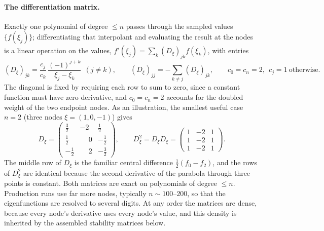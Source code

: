 \documentclass[11pt]{article}
\begin{document}
\paragraph{The differentiation matrix.} Exactly one polynomial of degree $\le n$ passes through
the sampled values $\{f(\xi_j)\}$; differentiating that interpolant and evaluating the result at
the nodes is a linear operation on the values, $f'(\xi_j)=\sum_k(D_\xi)_{jk}f(\xi_k)$, with
entries \cite{dons1995,trefethen2000}
\begin{equation}\label{eq:Dformula}
  (D_\xi)_{jk}=\frac{c_j}{c_k}\,\frac{(-1)^{j+k}}{\xi_j-\xi_k}\ \ (j\neq k),\qquad
  (D_\xi)_{jj}=-\!\!\sum_{k\neq j}(D_\xi)_{jk},\qquad
  c_0=c_n=2,\ \ c_j=1\ \text{otherwise}.
\end{equation}
The diagonal is fixed by requiring each row to sum to zero, since a constant function must have
zero derivative, and $c_0=c_n=2$ accounts for the doubled weight of the two endpoint nodes. As an
illustration, the smallest useful case $n=2$ (three nodes $\xi=(1,0,-1)$) gives
\begin{equation}\label{eq:Dexample}
  D_\xi=
  \begin{pmatrix}
    \tfrac32 & -2 & \tfrac12\\[3pt]
    \tfrac12 & \phantom{-}0 & -\tfrac12\\[3pt]
    -\tfrac12 & \phantom{-}2 & -\tfrac32
  \end{pmatrix},
  \qquad
  D_\xi^2=D_\xi D_\xi=
  \begin{pmatrix}
    1 & -2 & 1\\
    1 & -2 & 1\\
    1 & -2 & 1
  \end{pmatrix}.
\end{equation}
The middle row of $D_\xi$ is the familiar central difference $\tfrac12(f_0-f_2)$, and the rows of
$D_\xi^2$ are identical because the second derivative of the parabola through three points is
constant. Both matrices are exact on polynomials of degree $\le n$. Production runs use far more
nodes, typically $n\sim100$--$200$, so that the eigenfunctions are resolved to several digits. At any
order the matrices are dense, because every node's derivative uses every node's value, and this
density is inherited by the assembled stability matrices below.
\end{document}
